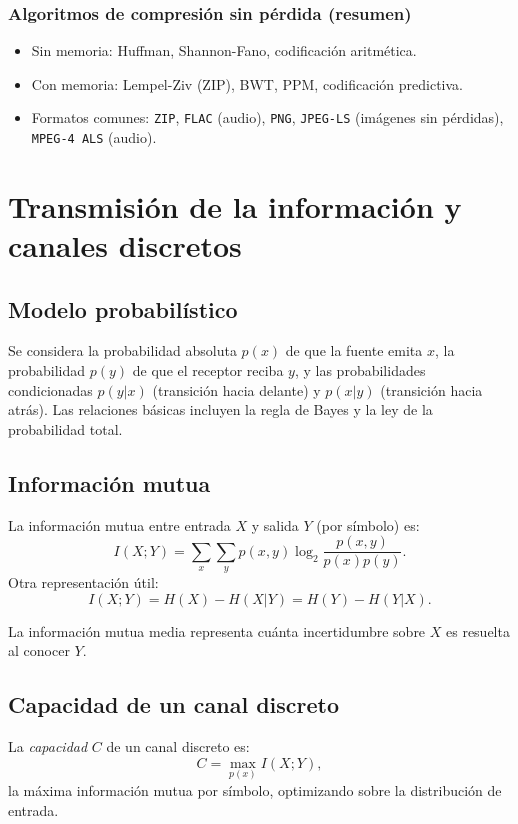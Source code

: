 \documentclass[11pt,a4paper]{article}
\begin{document}
\subsubsection{Algoritmos de compresión sin pérdida (resumen)}
\begin{itemize}
  \item Sin memoria: Huffman, Shannon-Fano, codificación aritmética.
  \item Con memoria: Lempel-Ziv (ZIP), BWT, PPM, codificación predictiva.
  \item Formatos comunes: \texttt{ZIP}, \texttt{FLAC} (audio), \texttt{PNG}, \texttt{JPEG-LS} (imágenes sin pérdidas), \texttt{MPEG-4 ALS} (audio).
\end{itemize}

\section{Transmisión de la información y canales discretos}
\subsection{Modelo probabilístico}
Se considera la probabilidad absoluta $p(x)$ de que la fuente emita $x$, la probabilidad $p(y)$ de que el receptor reciba $y$, y las probabilidades condicionadas $p(y|x)$ (transición hacia delante) y $p(x|y)$ (transición hacia atrás). Las relaciones básicas incluyen la regla de Bayes y la ley de la probabilidad total.

\subsection{Información mutua}
La información mutua entre entrada $X$ y salida $Y$ (por símbolo) es:
\[
I(X;Y)=\sum_{x}\sum_{y} p(x,y)\log_2\frac{p(x,y)}{p(x)p(y)}.
\]
Otra representación útil:
\[
I(X;Y)=H(X)-H(X|Y)=H(Y)-H(Y|X).
\]

La información mutua media representa cuánta incertidumbre sobre $X$ es resuelta al conocer $Y$.

\subsection{Capacidad de un canal discreto}
La \emph{capacidad} $C$ de un canal discreto es:
\[
C = \max_{p(x)} I(X;Y),
\]
la máxima información mutua por símbolo, optimizando sobre la distribución de entrada.

\end{document}
